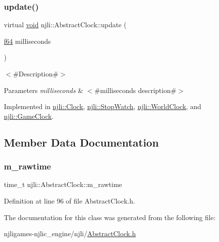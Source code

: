\subsubsection{\texorpdfstring{update()}{update()}}
{\footnotesize\ttfamily virtual \mbox{\hyperlink{_thread_8h_af1e856da2e658414cb2456cb6f7ebc66}{void}} njli\+::\+Abstract\+Clock\+::update (\begin{DoxyParamCaption}\item[{\mbox{\hyperlink{_util_8h_a94dab5770726ccbef8c7d026cfbdf8e5}{f64}}}]{milliseconds }\end{DoxyParamCaption})\hspace{0.3cm}{\ttfamily [pure virtual]}}

$<$\#\+Description\#$>$


\begin{DoxyParams}{Parameters}
{\em milliseconds} & $<$\#milliseconds description\#$>$ \\
\hline
\end{DoxyParams}


Implemented in \mbox{\hyperlink{classnjli_1_1_clock_aacf123c98c4ff46f5716b488423de72b}{njli\+::\+Clock}}, \mbox{\hyperlink{classnjli_1_1_stop_watch_a0ab1925582a66c67c1db0bf9f731f4cc}{njli\+::\+Stop\+Watch}}, \mbox{\hyperlink{classnjli_1_1_world_clock_ae68c432422e175aaa52746b99c57f843}{njli\+::\+World\+Clock}}, and \mbox{\hyperlink{classnjli_1_1_game_clock_a9eef69cf52e3b8591db5718c1c438618}{njli\+::\+Game\+Clock}}.



\subsection{Member Data Documentation}
\mbox{\label{classnjli_1_1_abstract_clock_a668e9ea61bf8c76643255af6b65f2a59}} 
\subsubsection{\texorpdfstring{m\+\_\+rawtime}{m\_rawtime}}
{\footnotesize\ttfamily time\+\_\+t njli\+::\+Abstract\+Clock\+::m\+\_\+rawtime\hspace{0.3cm}{\ttfamily [private]}}



Definition at line 96 of file Abstract\+Clock.\+h.



The documentation for this class was generated from the following file\+:\begin{DoxyCompactItemize}
\item 
njligames-\/njlic\+\_\+engine/njli/\mbox{\hyperlink{_abstract_clock_8h}{Abstract\+Clock.\+h}}\end{DoxyCompactItemize}
